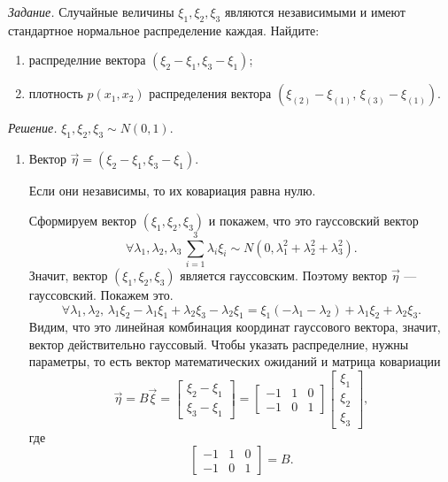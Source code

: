 \textit{Задание.}
Случайные величины $ \xi_1, \xi_2, \xi_3$
являются независимыми и имеют стандартное нормальное распределение каждая.
Найдите:
\begin{enumerate}[label=\alph*)]
  \item распределние вектора $ \left( \xi_2 - \xi_1, \xi_3 - \xi_1 \right) $;
  \item плотность $p \left( x_1, x_2 \right) $ распределения вектора
  $ \left( \xi_{ \left( 2 \right) } - \xi_{ \left( 1 \right) }, \,
    \xi_{ \left( 3 \right) } - \xi_{ \left( 1 \right) } \right) $.
\end{enumerate}

\textit{Решение.} $ \xi_1, \xi_2, \xi_3 \sim N \left( 0, 1 \right) $.
\begin{enumerate}[label=\alph*)]
  \item Вектор $ \vec{ \eta } = \left( \xi_2 - \xi_1, \xi_3 - \xi_1 \right) $.

  Если они независимы, то  их ковариация равна нулю.

  Сформируем вектор $ \left( \xi_1, \xi_2, \xi_3 \right) $ и покажем, что это гауссовский вектор
  $$ \forall \lambda_1, \lambda_2, \lambda_3 \, \sum \limits_{i = 1}^3 \lambda_i \xi_i \sim
    N \left( 0, \lambda_1^2 + \lambda_2^2 + \lambda_3^2 \right).$$
  Значит, вектор $ \left( \xi_1, \xi_2, \xi_3 \right) $ является гауссовским.
  Поэтому вектор $ \vec{ \eta }$ --- гауссовский.
  Покажем это.
  $$ \forall \lambda_1, \lambda_2, \,
    \lambda_1 \xi_2 - \lambda_1 \xi_1 + \lambda_2 \xi_3 - \lambda_2 \xi_1 =
    \xi_1 \left( - \lambda_1 - \lambda_2 \right) + \lambda_1 \xi_2 + \lambda_2 \xi_3.$$
  Видим, что это линейная комбинация координат гауссового вектора, значит,
  вектор действительно гауссовый.
  Чтобы указать распределние, нужны параметры,
  то есть вектор математических ожиданий и матрица ковариации
  $$ \vec{ \eta } = B \vec{ \xi } =
    \begin{bmatrix}
      \xi_2 - \xi_1 \\
      \xi_3 - \xi_1
    \end{bmatrix} =
    \begin{bmatrix}
      -1 & 1 & 0 \\
      -1 & 0 & 1
    \end{bmatrix}
    \begin{bmatrix}
      \xi_1 \\
      \xi_2 \\
      \xi_3
    \end{bmatrix},$$
  где
  $$ \begin{bmatrix}
      -1 & 1 & 0 \\
      -1 & 0 & 1
    \end{bmatrix} =
    B.$$


\end{enumerate}
